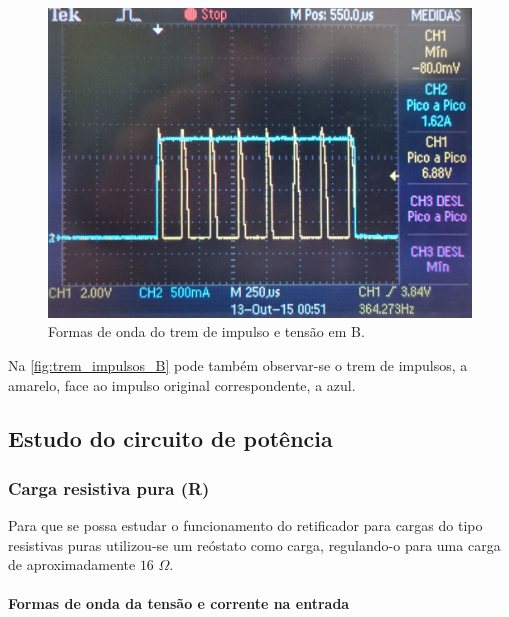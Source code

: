 \documentclass[a4paper,11pt]{article}
\numberwithin{equation}{section}
\begin{document}
\begin{figure}[H]
	\centering
	\includegraphics[keepaspectratio=true, scale=0.09]{img/figs/trem_impulsos_B}
	\caption{Formas de onda do trem de impulso e tensão em B.}
	\label{fig:trem_impulsos_B}
	\vspace{-0.8em}
\end{figure}

Na \autoref{fig:trem_impulsos_B} pode também observar-se o trem de impulsos, a amarelo, face ao impulso original correspondente, a azul.


\subsection{Estudo do circuito de potência}

\subsubsection{Carga resistiva pura (R)}

Para que se possa estudar o funcionamento do retificador para cargas do tipo resistivas puras utilizou-se um reóstato como carga, regulando-o para uma carga de aproximadamente $16$ $\Omega$.

\paragraph{Formas de onda da tensão e corrente na entrada}\mbox{}\
\end{document}
